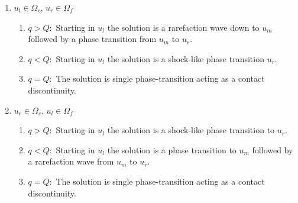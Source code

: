 \documentclass[10pt]{article}
\numberwithin{equation}{section}
\begin{document}
\begin{enumerate}
\item $u_l \in \Omega_c$, $u_r \in \Omega_f$ \newline
\newline
  \begin{minipage}[t]{0.4\linewidth}
    \begin{enumerate}
    \item $q > Q:$ Starting in $u_l$ the solution is a rarefaction wave down to $u_m$ followed by a phase transition  from $u_m$ to $u_r$.
    \item $q < Q:$ Starting in $u_l$ the solution is a shock-like phase transition $u_r$.
    \item $q = Q:$ The solution is single phase-transition acting as a contact discontinuity.
    \end{enumerate}
  \end{minipage}
  \begin{minipage}[t]{0.5\linewidth}
    \centering
    \strut\vspace*{-\baselineskip}\newline
  \end{minipage}
\item $u_r \in \Omega_c$, $u_l \in \Omega_f$ \newline
\newline
  \begin{minipage}[t]{0.4\linewidth}
    \begin{enumerate}
    \item $q > Q:$ Starting in $u_l$ the solution is a shock-like phase transition to $u_r$.
    \item $q < Q:$ Starting in $u_l$ the solution is a phase transition to $u_m$ followed by a rarefaction wave from $u_m$ to $u_r$.
    \item $q = Q:$ The solution is single phase-transition acting as a contact discontinuity.
    \end{enumerate}
  \end{minipage}
  \begin{minipage}[t]{0.5\linewidth}
    \centering
    \strut\vspace*{-\baselineskip}\newline
  \end{minipage}
  


\end{enumerate}
\end{document}

